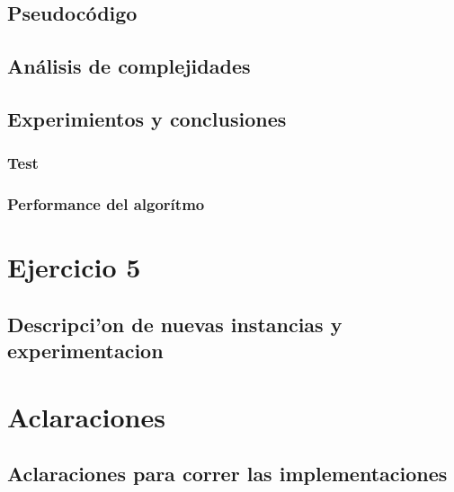 \documentclass[12pt, a4paper]{article}
\begin{document}
\subsection{Pseudoc\'odigo}

\subsection{An\'alisis de complejidades}

\subsection{Experimientos y conclusiones}
\subsubsection[2.5]{Test}

\subsubsection[2.5]{Performance del algorítmo}


\newpage
\section{Ejercicio 5} 
\subsection{Descripci'on de nuevas instancias y experimentacion}



\newpage
\section{Aclaraciones} 
\subsection{Aclaraciones para correr las implementaciones}

\end{document}
